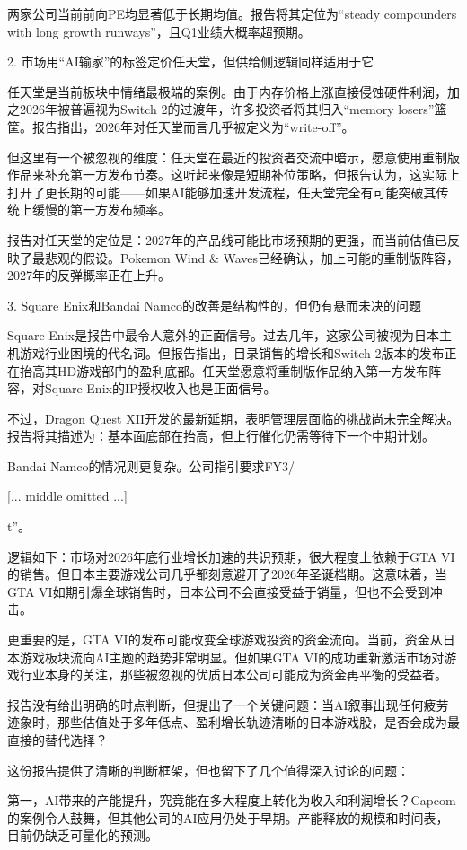 \documentclass[11pt]{ctexart}
\begin{document}
两家公司当前前向PE均显著低于长期均值。报告将其定位为“steady compounders with long growth runways”，且Q1业绩大概率超预期。

2. 市场用“AI输家”的标签定价任天堂，但供给侧逻辑同样适用于它

任天堂是当前板块中情绪最极端的案例。由于内存价格上涨直接侵蚀硬件利润，加之2026年被普遍视为Switch 2的过渡年，许多投资者将其归入“memory losers”篮筐。报告指出，2026年对任天堂而言几乎被定义为“write-off”。

但这里有一个被忽视的维度：任天堂在最近的投资者交流中暗示，愿意使用重制版作品来补充第一方发布节奏。这听起来像是短期补位策略，但报告认为，这实际上打开了更长期的可能——如果AI能够加速开发流程，任天堂完全有可能突破其传统上缓慢的第一方发布频率。

报告对任天堂的定位是：2027年的产品线可能比市场预期的更强，而当前估值已反映了最悲观的假设。Pokemon Wind \& Waves已经确认，加上可能的重制版阵容，2027年的反弹概率正在上升。

3. Square Enix和Bandai Namco的改善是结构性的，但仍有悬而未决的问题

Square Enix是报告中最令人意外的正面信号。过去几年，这家公司被视为日本主机游戏行业困境的代名词。但报告指出，目录销售的增长和Switch 2版本的发布正在抬高其HD游戏部门的盈利底部。任天堂愿意将重制版作品纳入第一方发布阵容，对Square Enix的IP授权收入也是正面信号。

不过，Dragon Quest XII开发的最新延期，表明管理层面临的挑战尚未完全解决。报告将其描述为：基本面底部在抬高，但上行催化仍需等待下一个中期计划。

Bandai Namco的情况则更复杂。公司指引要求FY3/

[... middle omitted ...]

t”。

逻辑如下：市场对2026年底行业增长加速的共识预期，很大程度上依赖于GTA VI的销售。但日本主要游戏公司几乎都刻意避开了2026年圣诞档期。这意味着，当GTA VI如期引爆全球销售时，日本公司不会直接受益于销量，但也不会受到冲击。

更重要的是，GTA VI的发布可能改变全球游戏投资的资金流向。当前，资金从日本游戏板块流向AI主题的趋势非常明显。但如果GTA VI的成功重新激活市场对游戏行业本身的关注，那些被忽视的优质日本公司可能成为资金再平衡的受益者。

报告没有给出明确的时点判断，但提出了一个关键问题：当AI叙事出现任何疲劳迹象时，那些估值处于多年低点、盈利增长轨迹清晰的日本游戏股，是否会成为最直接的替代选择？

这份报告提供了清晰的判断框架，但也留下了几个值得深入讨论的问题：

第一，AI带来的产能提升，究竟能在多大程度上转化为收入和利润增长？Capcom的案例令人鼓舞，但其他公司的AI应用仍处于早期。产能释放的规模和时间表，目前仍缺乏可量化的预测。
\end{document}
